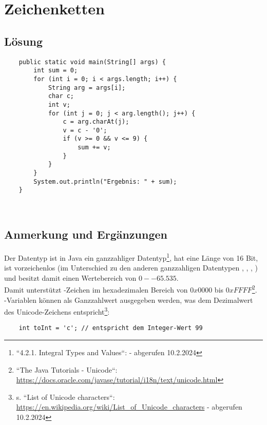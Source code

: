 \chapter{Zeichenketten}

\section{Lösung}

\begin{verbatim}
    public static void main(String[] args) {
        int sum = 0;
        for (int i = 0; i < args.length; i++) {
            String arg = args[i];
            char c;
            int v;
            for (int j = 0; j < arg.length(); j++) {
                c = arg.charAt(j);
                v = c - '0';
                if (v >= 0 && v <= 9) {
                    sum += v;
                }
            }
        }
        System.out.println("Ergebnis: " + sum);
    }
\end{verbatim}\\

\section{Anmerkung und Ergänzungen}

Der Datentyp  ist in Java ein ganzzahliger Datentyp\footnote{
    ``4.2.1. Integral Types and Values``:  - abgerufen 10.2.2024
}, hat eine Länge von 16 Bit, ist vorzeichenlos (im Unterschied zu den anderen ganzzahligen Datentypen , , , ) und besitzt damit einen Wertebereich von $0 -- 65.535$.\\
Damit unterstützt  -Zeichen im hexadezimalen Bereich von $0x0000$ bis $0xFFFF$\footnote{
    ``The Java Tutorials - Unicode``: \url{https://docs.oracle.com/javase/tutorial/i18n/text/unicode.html}
}.\\

\noindent
{}-Variablen können als Ganzzahlwert ausgegeben werden, was dem Dezimalwert des Unicode-Zeichens entspricht\footnote{s. ``List of Unicode characters``: \url{https://en.wikipedia.org/wiki/List_of_Unicode_characters} - abgerufen 10.2.2024}:

\begin{verbatim}
    int toInt = 'c'; // entspricht dem Integer-Wert 99
\end{verbatim}

